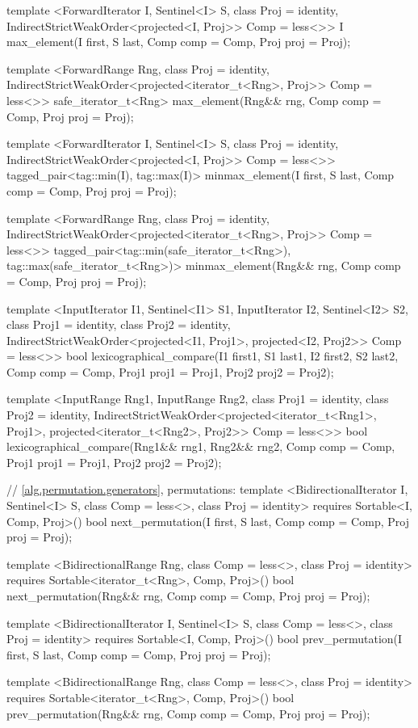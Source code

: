 \begin{codeblock}
{{{{  template <ForwardIterator I, Sentinel<I> S, class Proj = identity,
      IndirectStrictWeakOrder<projected<I, Proj>> Comp = less<>>
    I max_element(I first, S last, Comp comp = Comp{}, Proj proj = Proj{});

  template <ForwardRange Rng, class Proj = identity,
      IndirectStrictWeakOrder<projected<iterator_t<Rng>, Proj>> Comp = less<>>
    safe_iterator_t<Rng>
      max_element(Rng&& rng, Comp comp = Comp{}, Proj proj = Proj{});

  template <ForwardIterator I, Sentinel<I> S, class Proj = identity,
      IndirectStrictWeakOrder<projected<I, Proj>> Comp = less<>>
    tagged_pair<tag::min(I), tag::max(I)>
      minmax_element(I first, S last, Comp comp = Comp{}, Proj proj = Proj{});

  template <ForwardRange Rng, class Proj = identity,
      IndirectStrictWeakOrder<projected<iterator_t<Rng>, Proj>> Comp = less<>>
    tagged_pair<tag::min(safe_iterator_t<Rng>),
                tag::max(safe_iterator_t<Rng>)>
      minmax_element(Rng&& rng, Comp comp = Comp{}, Proj proj = Proj{});

  template <InputIterator I1, Sentinel<I1> S1, InputIterator I2, Sentinel<I2> S2,
      class Proj1 = identity, class Proj2 = identity,
      IndirectStrictWeakOrder<projected<I1, Proj1>, projected<I2, Proj2>> Comp = less<>>
    bool
      lexicographical_compare(I1 first1, S1 last1, I2 first2, S2 last2,
                              Comp comp = Comp{}, Proj1 proj1 = Proj1{}, Proj2 proj2 = Proj2{});

  template <InputRange Rng1, InputRange Rng2, class Proj1 = identity,
      class Proj2 = identity,
      IndirectStrictWeakOrder<projected<iterator_t<Rng1>, Proj1>,
        projected<iterator_t<Rng2>, Proj2>> Comp = less<>>
    bool
      lexicographical_compare(Rng1&& rng1, Rng2&& rng2, Comp comp = Comp{},
                              Proj1 proj1 = Proj1{}, Proj2 proj2 = Proj2{});

  // \ref{alg.permutation.generators}, permutations:
  template <BidirectionalIterator I, Sentinel<I> S, class Comp = less<>,
      class Proj = identity>
    requires Sortable<I, Comp, Proj>()
    bool next_permutation(I first, S last, Comp comp = Comp{}, Proj proj = Proj{});

  template <BidirectionalRange Rng, class Comp = less<>,
      class Proj = identity>
    requires Sortable<iterator_t<Rng>, Comp, Proj>()
    bool
      next_permutation(Rng&& rng, Comp comp = Comp{}, Proj proj = Proj{});

  template <BidirectionalIterator I, Sentinel<I> S, class Comp = less<>,
      class Proj = identity>
    requires Sortable<I, Comp, Proj>()
    bool prev_permutation(I first, S last, Comp comp = Comp{}, Proj proj = Proj{});

  template <BidirectionalRange Rng, class Comp = less<>,
      class Proj = identity>
    requires Sortable<iterator_t<Rng>, Comp, Proj>()
    bool
      prev_permutation(Rng&& rng, Comp comp = Comp{}, Proj proj = Proj{});
}}}}
\end{codeblock}

